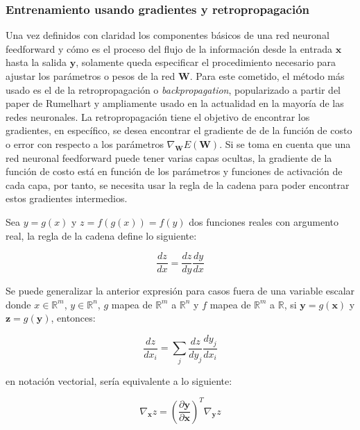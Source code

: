         \subsubsection{Entrenamiento usando gradientes y retropropagación} \label{sec:gradientes}

        Una vez definidos con claridad los componentes básicos de una red neuronal feedforward y cómo es el proceso del flujo 
        de la información desde la entrada $\mathbf{x}$ hasta la salida $\mathbf{y}$, solamente queda especificar el procedimiento 
        necesario para ajustar los parámetros o pesos de la red $\mathbf{W}$. Para este cometido, el método más usado es el 
        de la retropropagación o \textit{backpropagation}, popularizado a partir del paper de Rumelhart \cite{rumelhart1986learning} 
        y ampliamente usado en la actualidad en la mayoría de las redes neuronales. La retropropagación tiene el objetivo de 
        encontrar los gradientes, en específico, se desea encontrar el gradiente de de la función de costo o error con respecto 
        a los parámetros $\nabla_{\mathbf{W}}E(\mathbf{W})$. Si se toma en cuenta que una red neuronal feedforward puede tener 
        varias capas ocultas, la gradiente de la función de costo está en función de los parámetros y funciones de activación 
        de cada capa, por tanto, se necesita usar la regla de la cadena para poder encontrar estos gradientes intermedios.

        Sea $y = g(x)$ y $z = f(g(x)) = f(y)$ dos funciones reales con argumento real, la regla de la cadena define lo siguiente:

        \begin{equation}
            \frac{dz}{dx} = \frac{dz}{dy} \frac{dy}{dx}
        \end{equation}

        Se puede generalizar la anterior expresión para casos fuera de una variable escalar donde $x \in \mathbb{R}^m$, 
        $y \in \mathbb{R}^n$, $g$ mapea de $\mathbb{R}^m$ a $\mathbb{R}^n$ y $f$ mapea de $\mathbb{R}^m$ a $\mathbb{R}$,
        si $\mathbf{y} = g(\mathbf{x})$ y $\mathbf{z} = g(\mathbf{y})$, entonces:

        \begin{equation}
            \frac{dz}{dx_i} =\sum_j \frac{dz}{dy_j} \frac{dy_j}{dx_i}
        \end{equation}

        en notación vectorial, sería equivalente a lo siguiente:

        \begin{equation}
            \nabla_{\mathbf{x}}z = \left( \frac{\partial \mathbf{y}}{\partial \mathbf{x}} \right)^T \nabla_{\mathbf{y}} z
        \end{equation}

